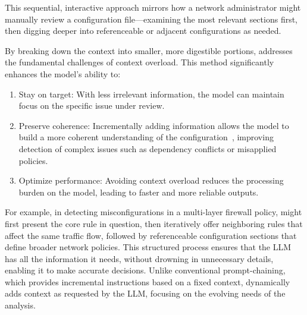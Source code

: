 This sequential, interactive approach mirrors how a network administrator might manually review a configuration file—examining the most relevant sections first, then digging deeper into referenceable or adjacent configurations as needed.


By breaking down the context into smaller, more digestible portions, \sysname{} addresses the fundamental challenges of context overload. This method significantly enhances the model’s ability to:
\begin{enumerate}
    \item Stay on target: With less irrelevant information, the model can maintain focus on the specific issue under review.
    \item Preserve coherence: Incrementally adding information allows the model to build a more coherent understanding of the configuration~\cite{li2023prompt,subramonyam2024bridging}, improving detection of complex issues such as dependency conflicts or misapplied policies.
    \item Optimize performance: Avoiding context overload reduces the processing burden on the model, leading to faster and more reliable outputs.
\end{enumerate}

For example, in detecting misconfigurations in a multi-layer firewall policy, \sysname{} might first present the core rule in question, then iteratively offer neighboring rules that affect the same traffic flow, followed by referenceable configuration sections that define broader network policies. This structured process ensures that the LLM has all the information it needs, without drowning in unnecessary details, enabling it to make accurate decisions. Unlike conventional prompt-chaining, which provides incremental instructions based on a fixed context, \sysname{} dynamically adds context as requested by the LLM, focusing on the evolving needs of the analysis.


